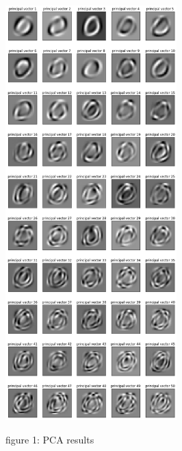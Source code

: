\documentclass{homework}
\begin{document}
\centering
\includegraphics[width=250]{PCA_result.png}

\caption{figure 1: PCA results}

\raggedright
\end{document}
